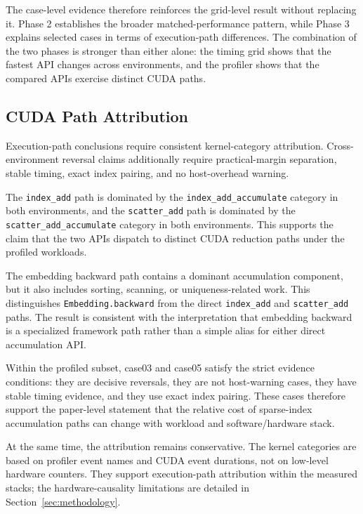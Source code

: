 The case-level evidence therefore reinforces the grid-level result without replacing it. Phase 2 establishes the broader matched-performance pattern, while Phase 3 explains selected cases in terms of execution-path differences. The combination of the two phases is stronger than either alone: the timing grid shows that the fastest API changes across environments, and the profiler shows that the compared APIs exercise distinct CUDA paths.

\subsection{CUDA Path Attribution}

Execution-path conclusions require consistent kernel-category attribution. Cross-environment reversal claims additionally require practical-margin separation, stable timing, exact index pairing, and no host-overhead warning.

% 

The \texttt{index\_\allowbreak add} path is dominated by the \texttt{index\_\allowbreak add\_\allowbreak accumulate} category in both environments, and the \texttt{scatter\_\allowbreak add} path is dominated by the \texttt{scatter\_\allowbreak add\_\allowbreak accumulate} category in both environments. This supports the claim that the two APIs dispatch to distinct CUDA reduction paths under the profiled workloads.

The embedding backward path contains a dominant accumulation component, but it also includes sorting, scanning, or uniqueness-related work. This distinguishes \texttt{Embedding.\allowbreak backward} from the direct \texttt{index\_\allowbreak add} and \texttt{scatter\_\allowbreak add} paths. The result is consistent with the interpretation that embedding backward is a specialized framework path rather than a simple alias for either direct accumulation API.

Within the profiled subset, case03 and case05 satisfy the strict evidence conditions: they are decisive reversals, they are not host-warning cases, they have stable timing evidence, and they use exact index pairing. These cases therefore support the paper-level statement that the relative cost of sparse-index accumulation paths can change with workload and software/hardware stack.

At the same time, the attribution remains conservative. The kernel categories are based on profiler event names and CUDA event durations, not on low-level hardware counters. They support execution-path attribution within the measured stacks; the hardware-causality limitations are detailed in Section~\ref{sec:methodology}.

